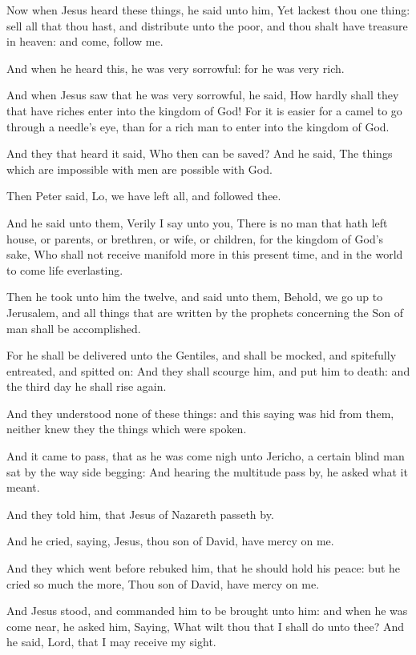 \verse Now when Jesus heard these things, he said unto him, Yet lackest thou one thing: sell all that thou hast, and distribute unto the poor, and thou shalt have treasure in heaven: and come, follow me.

\verse And when he heard this, he was very sorrowful: for he was very rich.

\verse And when Jesus saw that he was very sorrowful, he said, How hardly shall they that have riches enter into the kingdom of God!  \verse For it is easier for a camel to go through a needle's eye, than for a rich man to enter into the kingdom of God.

\verse And they that heard it said, Who then can be saved?  \verse And he said, The things which are impossible with men are possible with God.

\verse Then Peter said, Lo, we have left all, and followed thee.

\verse And he said unto them, Verily I say unto you, There is no man that hath left house, or parents, or brethren, or wife, or children, for the kingdom of God's sake, \verse Who shall not receive manifold more in this present time, and in the world to come life everlasting.

\verse Then he took unto him the twelve, and said unto them, Behold, we go up to Jerusalem, and all things that are written by the prophets concerning the Son of man shall be accomplished.

\verse For he shall be delivered unto the Gentiles, and shall be mocked, and spitefully entreated, and spitted on: \verse And they shall scourge him, and put him to death: and the third day he shall rise again.

\verse And they understood none of these things: and this saying was hid from them, neither knew they the things which were spoken.

\verse And it came to pass, that as he was come nigh unto Jericho, a certain blind man sat by the way side begging: \verse And hearing the multitude pass by, he asked what it meant.

\verse And they told him, that Jesus of Nazareth passeth by.

\verse And he cried, saying, Jesus, thou son of David, have mercy on me.

\verse And they which went before rebuked him, that he should hold his peace: but he cried so much the more, Thou son of David, have mercy on me.

\verse And Jesus stood, and commanded him to be brought unto him: and when he was come near, he asked him, \verse Saying, What wilt thou that I shall do unto thee? And he said, Lord, that I may receive my sight.

